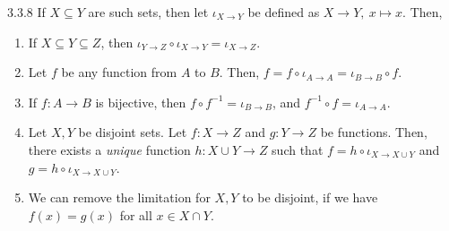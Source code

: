 \begin{exercise}{3.3.8}
	If $X \subseteq Y$ are such sets, then let $\iota_{X \to Y}$ be defined as $X \to Y,\ x \mapsto x$. Then,
	\begin{enumerate}
		\item If $X \subseteq Y \subseteq Z$, then $\iota_{Y \to Z} \circ \iota_{X \to Y} = \iota_{X \to Z}$.
		\item Let $f$ be any function from $A$ to $B$. Then, $f = f \circ \iota_{A \to A} = \iota_{B \to B} \circ f$.
		\item If $f: A \to B$ is bijective, then $f \circ f^{-1} = \iota_{B \to B}$, and $f^{-1} \circ f = \iota_{A \to A}$.
		\item Let $X,Y$ be disjoint sets. Let $f: X \to Z$ and $g: Y \to Z$ be functions. Then, there exists a \emph{unique} function $h: X \cup Y \to Z$ such that $f = h \circ \iota_{X \to X \cup Y}$ and $g = h \circ \iota_{X \to X \cup Y}$.
		\item We can remove the limitation for $X,Y$ to be disjoint, if we have $f(x) = g(x)$ for all $x \in X \cap Y$.
	\end{enumerate}
\end{exercise}

